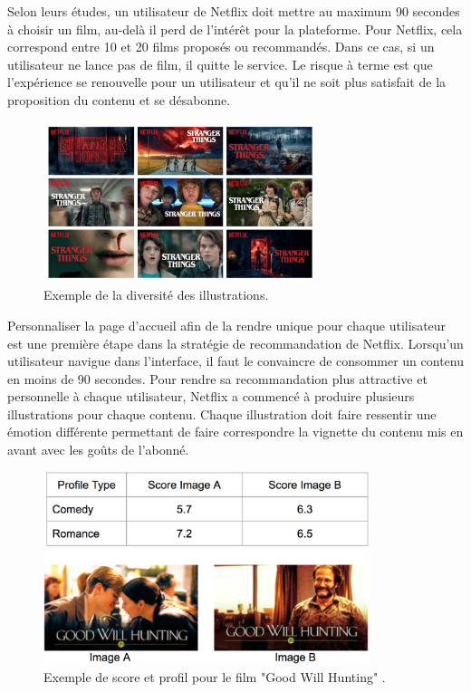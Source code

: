 \vspace{5mm}


Selon leurs études, un utilisateur de Netflix doit mettre au maximum 90 secondes à choisir un film, au-delà il perd de l'intérêt pour la plateforme. Pour Netflix, cela correspond entre 10 et 20 films proposés ou recommandés. Dans ce cas, si un utilisateur ne lance pas de film, il quitte le service. Le risque à terme est que l’expérience se renouvelle pour un utilisateur et qu’il ne soit plus satisfait de la proposition du contenu et se désabonne. 

\vspace{5mm}

\begin{figure}[htp]
  \centering
  \includegraphics[width=80mm]{./src_img/strangerthings}
  \caption{Exemple de la diversité des illustrations.\supercite{franceInfoEnq}}
  \label{fig:deux-trois}
\end{figure}

\vspace{5mm}

Personnaliser la page d’accueil afin de la rendre unique pour chaque utilisateur est une première étape dans la stratégie de recommandation de Netflix. Lorsqu’un utilisateur navigue dans l’interface, il faut le convaincre de consommer un contenu en moins de 90 secondes.  
Pour rendre sa recommandation plus attractive et personnelle à chaque utilisateur, Netflix a commencé à produire plusieurs illustrations pour chaque contenu. Chaque illustration doit faire ressentir une émotion différente permettant de faire correspondre la vignette du contenu mis en avant avec les goûts de l’abonné.


\vspace{5mm}

\begin{figure}[htp]
  \centering
  \includegraphics[width=95mm]{./src_img/score}
  \caption{Exemple de score et profil pour le film "Good Will Hunting" .}
  \label{fig:deux-quatre}
\end{figure}


